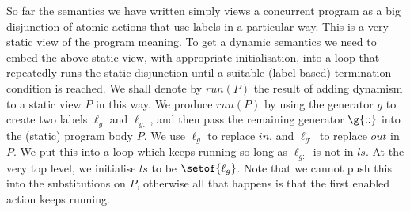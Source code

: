 So far the semantics we have written simply views a concurrent program
as a big disjunction of atomic actions that use labels in a particular way.
This is a very static view of the program meaning.
To get a dynamic semantics we need to embed the above static
view, with appropriate initialisation,
into a loop that repeatedly runs the static disjunction
until a suitable (label-based) termination condition is reached.
We shall denote by $run(P)$ the result of adding dynamism
to a static view $P$ in this way.
We produce $run(P)$ by using the generator $g$
to create two labels $\ell_g$ and $\ell_{g:}$,
and then pass the remaining generator $\g{::}$
into the (static) program body $P$.
We use $\ell_g$ to replace $in$,
and $\ell_{g:}$ to replace $out$ in $P$.
We put this into a loop which keeps running so long as $\ell_{g:}$
is not in $ls$.
At the very top level, we initialise $ls$ to be $\setof{\ell_g}$.
Note that we cannot push this into the substitutions on $P$,
otherwise all that happens is that the first enabled action keeps running.

